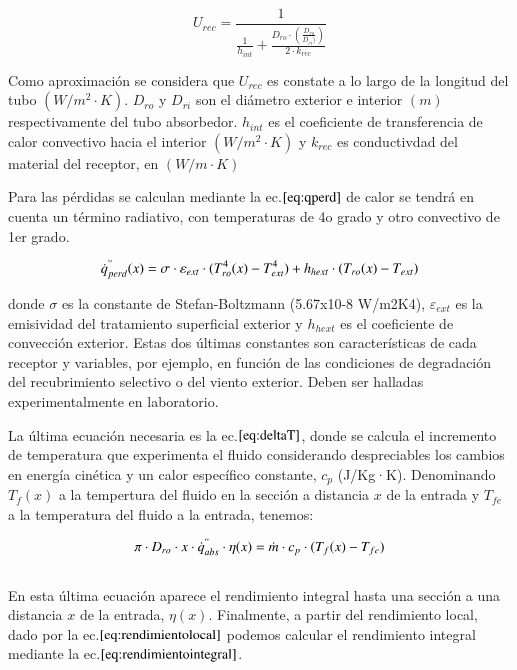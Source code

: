 \begin{equation}
    U_{rec} = \frac{1}{\frac{1}{h_{int}} + \frac{D_{ro}\cdot(\frac{D_{ro}}{D_{ri})})}{2\cdot k_{rec}}} \label{eq:urec}
\end{equation}

Como aproximación se considera que \(U_{rec}\) es constate a lo largo de la longitud del tubo \((W/m^{2}\cdot K)\). \(D_{ro}\) y \(D_{ri}\) son el diámetro exterior e interior \((m)\) respectivamente del tubo absorbedor. \(h_{int}\) es el coeficiente de transferencia de calor convectivo hacia el interior \((W/m^{2}\cdot K)\) y \(k_{rec}\) es conductivdad del material del receptor, en \((W/m\cdot K)\)

Para las pérdidas se calculan mediante la ec.\(\eqref{eq:qperd}\) de calor se tendrá en cuenta un término radiativo, con temperaturas de 4o grado y otro convectivo de 1er grado. 

\begin{equation}
    \dot{q}^{"}_{perd}(x)= \sigma \cdot \varepsilon_{ext} \cdot (T_{ro}^{4}(x)-T_{ext}^{4}) + h_{hext} \cdot (T_{ro}(x)-T_{ext}) \label{eq:qperd}
\end{equation}

donde \(\sigma\) es la constante de Stefan-Boltzmann (5.67x10-8 W/m2K4), \(\varepsilon_{ext}\) es la emisividad del tratamiento superficial exterior y \(h_{hext}\) es el coeficiente de convección exterior. Estas dos últimas constantes son características de cada receptor y variables, por ejemplo, en función de las condiciones de degradación del recubrimiento selectivo o del viento exterior. Deben ser halladas experimentalmente en laboratorio.

La última ecuación necesaria es la ec.\(\eqref{eq:deltaT}\), donde se calcula el incremento de temperatura que experimenta el fluido considerando despreciables los cambios en energía cinética y un calor específico constante, \(c_{p}\) (J/Kg·K). Denominando \(T_{f}(x)\) a la tempertura del fluido en la sección a distancia \(x\) de la entrada y \(T_{fe}\) a la temperatura del fluido a la entrada, tenemos:

\begin{equation}
    \pi \cdot D_{ro} \cdot x \cdot \dot{q}^{"}_{abs} \cdot \eta(x)= \dot{m} \cdot c_{p} \cdot (T_{f}(x)-T_{fe}) \label{eq:deltaT}
\end{equation}\\

En esta última ecuación aparece el rendimiento integral hasta una sección a una distancia \(x\) de la entrada, \(\eta(x)\). Finalmente, a partir del rendimiento local, dado por la ec.\(\eqref{eq:rendimientolocal}\) podemos calcular el rendimiento integral mediante la ec.\(\eqref{eq:rendimientointegral}\).

